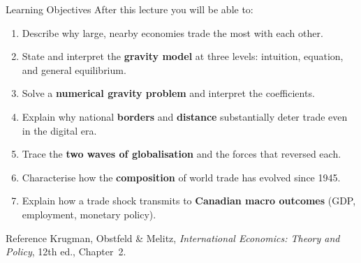 \documentclass[aspectratio=169]{beamer}
\begin{document}
\begin{frame}{Learning Objectives}
After this lecture you will be able to:
\begin{enumerate}
  \item Describe why large, nearby economies trade the most with each other.
  \item State and interpret the \textbf{gravity model} at three levels: intuition, equation, and general equilibrium.
  \item Solve a \textbf{numerical gravity problem} and interpret the coefficients.
  \item Explain why national \textbf{borders} and \textbf{distance} substantially deter trade even in the digital era.
  \item Trace the \textbf{two waves of globalisation} and the forces that reversed each.
  \item Characterise how the \textbf{composition} of world trade has evolved since 1945.
  \item Explain how a trade shock transmits to \textbf{Canadian macro outcomes} (GDP, employment, monetary policy).
\end{enumerate}
\begin{block}{Reference}
  Krugman, Obstfeld \& Melitz, \textit{International Economics: Theory and Policy}, 12th ed., Chapter~2.
\end{block}
\end{frame}

\end{document}
